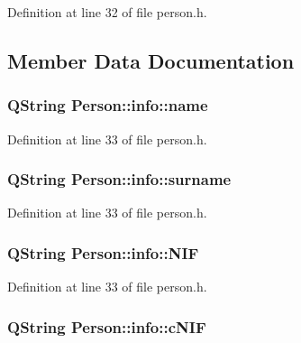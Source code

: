Definition at line 32 of file person.\+h.



\subsection{Member Data Documentation}
\hypertarget{struct_person_1_1info_a8ab46165bb77b7882e956aba3101fa85}{
\subsubsection[{name}]{\setlength{\rightskip}{0pt plus 5cm}Q\+String Person\+::info\+::name}}\label{struct_person_1_1info_a8ab46165bb77b7882e956aba3101fa85}


Definition at line 33 of file person.\+h.

\hypertarget{struct_person_1_1info_acf04a7168c9c5d559f2503f5c0dfe617}{
\subsubsection[{surname}]{\setlength{\rightskip}{0pt plus 5cm}Q\+String Person\+::info\+::surname}}\label{struct_person_1_1info_acf04a7168c9c5d559f2503f5c0dfe617}


Definition at line 33 of file person.\+h.

\hypertarget{struct_person_1_1info_ad60a1409eef3fa675d378d34f0a23318}{
\subsubsection[{N\+I\+F}]{\setlength{\rightskip}{0pt plus 5cm}Q\+String Person\+::info\+::\+N\+I\+F}}\label{struct_person_1_1info_ad60a1409eef3fa675d378d34f0a23318}


Definition at line 33 of file person.\+h.

\hypertarget{struct_person_1_1info_a05bf59483c45d0cefac792cd143746b3}{
\subsubsection[{c\+N\+I\+F}]{\setlength{\rightskip}{0pt plus 5cm}Q\+String Person\+::info\+::c\+N\+I\+F}}\label{struct_person_1_1info_a05bf59483c45d0cefac792cd143746b3}


